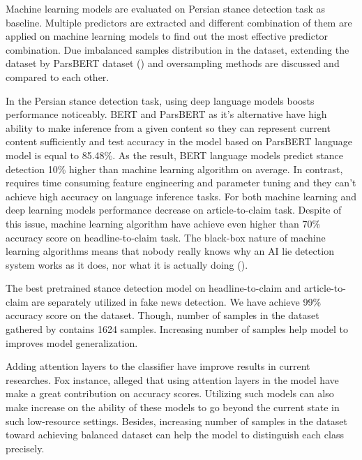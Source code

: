 Machine learning models are evaluated on Persian stance detection task as baseline. Multiple predictors are extracted and different combination of them are applied on machine learning models to find out the most effective predictor combination. Due imbalanced samples distribution in the \cite{stance_persian} dataset, extending the dataset by ParsBERT dataset (\cite{parsbert}) and oversampling methods are discussed and compared to each other.

In the Persian stance detection task, using deep language models boosts performance noticeably. BERT and ParsBERT as it's alternative have high ability to make inference from a given content so they can represent current content sufficiently and test accuracy in the model based on ParsBERT language model is equal to 85.48\%. As the result,  BERT language models predict stance detection 10\% higher than machine learning algorithm on average. In contrast, requires time consuming feature engineering and parameter tuning and they can't achieve high accuracy on language inference tasks. For both machine learning and deep learning models performance decrease on article-to-claim task. Despite of this issue, machine learning algorithm have achieve even higher than 70\% accuracy score on headline-to-claim task. The black-box nature of machine learning algorithms means that nobody really knows why an AI lie detection system works as it does, nor what it is actually doing (\cite{book_fake}). 

The best pretrained stance detection model on headline-to-claim and article-to-claim are separately utilized in fake news detection. We have achieve 99\% accuracy score on the \cite{stance_persian} dataset. Though, number of samples in the dataset gathered by \cite{stance_persian} contains 1624 samples. Increasing number of samples help model to improves model generalization.

Adding attention layers to the classifier have improve results in current researches. Fox instance, \cite{book_disinformation} alleged that using attention layers in the model have make a great contribution on accuracy scores. Utilizing such models can also make increase on the ability of these models to go beyond the current state in such low-resource settings. Besides, increasing number of samples in the \cite{stance_persian} dataset toward achieving balanced dataset can help the model to distinguish each class precisely. 
 
 
 